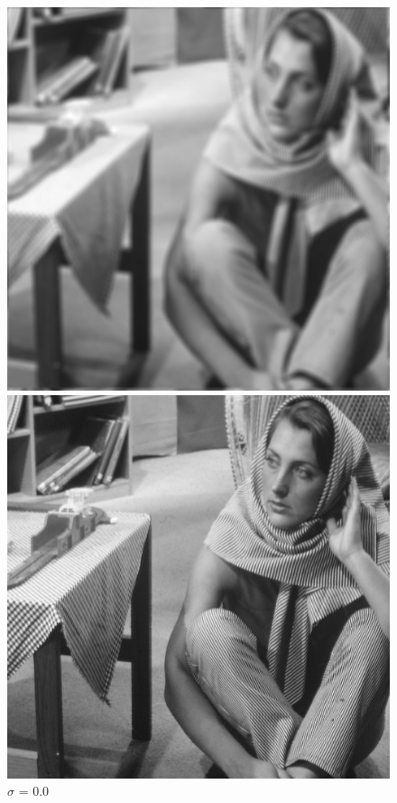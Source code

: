 \documentclass{article}
\begin{document}
    \begin{figure}[!htb]
      \includegraphics[scale=.28]{./deblurring/0/final.png}
      \caption{\(\sigma\) = 0.0}
    \endminipage\hfill
      \includegraphics[scale=.28]{./deblurring/0/recover.png}

\end{figure}
\end{document}
